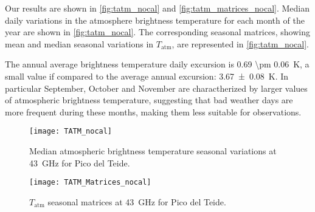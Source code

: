 Our results are shown in \autoref{fig:tatm_nocal} and
\autoref{fig:tatm_matrices_nocal}. Median daily variations in the
atmosphere brightness temperature for each month of the year are shown in
\autoref{fig:tatm_nocal}. The corresponding seasonal matrices, showing mean
and median seasonal variations in $T_\text{atm}$, are represented in
\autoref{fig:tatm_nocal}.

The annual average brightness temperature daily excursion is \SI{0.69 \pm
0.06}{\kelvin}, a small value if compared to the average annual
excursion: \SI{3.67 \pm 0.08}{\kelvin}. In particular
September, October and November are charactherized by larger values of
atmospheric brightness temperature, suggesting that bad weather days are more
frequent during these months, making them less suitable for observations.

\begin{figure}
        \centering
        \texttt{[image: TATM\_nocal]}
        \caption{Median atmospheric brightness temperature seasonal
        variations at \SI{43}{\giga\hertz} for Pico del Teide.}
        \label{fig:tatm_nocal}
\end{figure}

\begin{figure}
        \centering
        \texttt{[image: TATM\_Matrices\_nocal]}
        \caption{$T_\text{atm}$ seasonal matrices at \SI{43}{\giga\hertz}
        for Pico del Teide.}
        \label{fig:tatm_matrices_nocal}
\end{figure}


